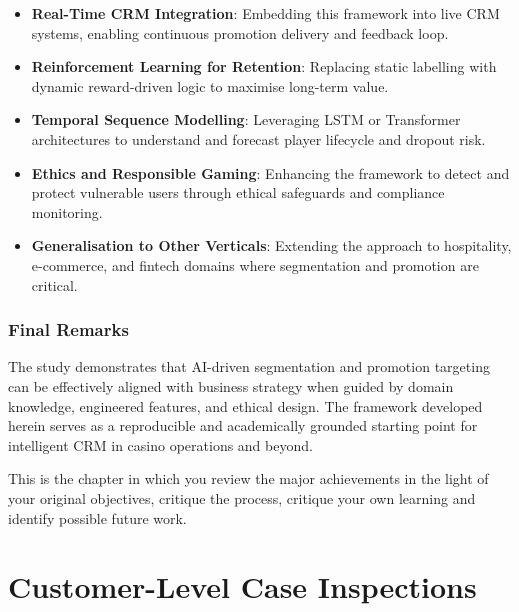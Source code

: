 \documentclass[12pt,a4paper]{report}
\begin{document}
\begin{itemize}
    \item \textbf{Real-Time CRM Integration}: Embedding this framework into live CRM systems, enabling continuous promotion delivery and feedback loop.
    \item \textbf{Reinforcement Learning for Retention}: Replacing static labelling with dynamic reward-driven logic to maximise long-term value.
    \item \textbf{Temporal Sequence Modelling}: Leveraging LSTM or Transformer architectures to understand and forecast player lifecycle and dropout risk.
    \item \textbf{Ethics and Responsible Gaming}: Enhancing the framework to detect and protect vulnerable users through ethical safeguards and compliance monitoring.
    \item \textbf{Generalisation to Other Verticals}: Extending the approach to hospitality, e-commerce, and fintech domains where segmentation and promotion are critical.
\end{itemize}

\subsection*{Final Remarks}

The study demonstrates that AI-driven segmentation and promotion targeting can be effectively aligned with business strategy when guided by domain knowledge, engineered features, and ethical design. The framework developed herein serves as a reproducible and academically grounded starting point for intelligent CRM in casino operations and beyond.




This is the chapter in which you review the major achievements in the light of your original objectives, critique the process, critique your own learning and identify possible future work.



\appendix
\appendix
\chapter{Customer-Level Case Inspections}
\label{appendix:case_inspection}
\end{document}
